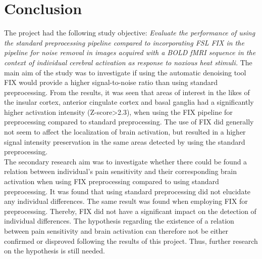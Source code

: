 \chapter{Conclusion}

The project had the following study objective: \textit{Evaluate the performance of using the standard preprocessing pipeline compared to incorporating FSL FIX in the pipeline for noise removal in images acquired with a BOLD fMRI sequence in the context of individual cerebral activation as response to noxious heat stimuli.} The main aim of the study was to investigate if using the automatic denoising tool FIX would provide a higher signal-to-noise ratio than using standard preprocessing. From the results, it was seen that areas of interest in the likes of the insular cortex, anterior cingulate cortex and basal ganglia had a significantly higher activation intensity (Z-score>2.3), when using the FIX pipeline for preprocessing compared to standard preprocessing. The use of FIX did generally not seem to affect the localization of brain activation, but resulted in a higher signal intensity preservation in the same areas detected by using the standard preprocessing. \\
The secondary research aim was to investigate whether there could be found a relation between individual’s pain sensitivity and their corresponding brain activation when using FIX preprocessing compared to using standard preprocessing. It was found that using standard preprocessing did not elucidate any individual differences. The same result was found when employing FIX for preprocessing. Thereby, FIX did not have a significant impact on the detection of individual differences. The hypothesis regarding the existence of a relation between pain sensitivity and brain activation can therefore not be either confirmed or disproved following the results of this project. Thus, further research on the hypothesis is still needed. 